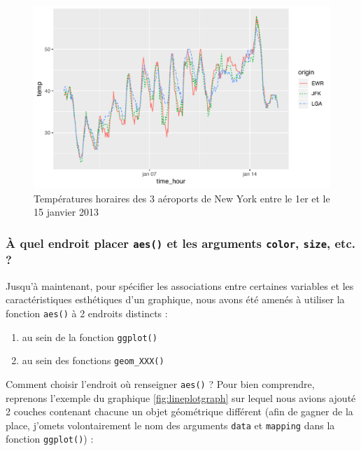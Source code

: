 \documentclass[a4paperpaper,]{article}
\providecommand{\tightlist}{%
  \setlength{\itemsep}{0pt}\setlength{\parskip}{0pt}}
\theoremstyle{definition}
\theoremstyle{definition}
\theoremstyle{definition}
\theoremstyle{remark}
\begin{document}
\begin{figure}[htpb]

{\centering \includegraphics[width=0.9\linewidth]{figure/linetypecolor-1} 

}

\caption{Températures horaires des 3 aéroports de New York entre le 1er et le 15 janvier 2013}\label{fig:linetypecolor}
\end{figure}

\subsubsection{\texorpdfstring{À quel endroit placer \texttt{aes()} et
les arguments \texttt{color}, \texttt{size}, etc.
?}{À quel endroit placer aes() et les arguments color, size, etc. ?}}\label{a-quel-endroit-placer-aes-et-les-arguments-color-size-etc.}

Jusqu'à maintenant, pour spécifier les associations entre certaines
variables et les caractéristiques esthétiques d'un graphique, nous avons
été amenés à utiliser la fonction \texttt{aes()} à 2 endroits distincts
:

\begin{enumerate}
\def\labelenumi{\arabic{enumi}.}
\tightlist
\item
  au sein de la fonction \texttt{ggplot()}
\item
  au sein des fonctions \texttt{geom\_XXX()}
\end{enumerate}

Comment choisir l'endroit où renseigner \texttt{aes()} ? Pour bien
comprendre, reprenons l'exemple du graphique \ref{fig:lineplotgraph} sur
lequel nous avions ajouté 2 couches contenant chacune un objet
géométrique différent (afin de gagner de la place, j'omets
volontairement le nom des arguments \texttt{data} et \texttt{mapping}
dans la fonction \texttt{ggplot()}) :
\end{document}
